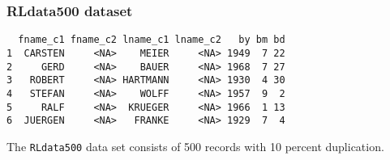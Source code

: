 \documentclass[compress]{beamer}
\theoremstyle{plain}
\begin{document}
\begin{frame}[fragile]
\frametitle{RLdata500 dataset}

\begin{verbatim}
  fname_c1 fname_c2 lname_c1 lname_c2   by bm bd
1  CARSTEN     <NA>    MEIER     <NA> 1949  7 22
2     GERD     <NA>    BAUER     <NA> 1968  7 27
3   ROBERT     <NA> HARTMANN     <NA> 1930  4 30
4   STEFAN     <NA>    WOLFF     <NA> 1957  9  2
5     RALF     <NA>  KRUEGER     <NA> 1966  1 13
6  JUERGEN     <NA>   FRANKE     <NA> 1929  7  4
\end{verbatim}

The \texttt{RLdata500} data set consists of 500 records with 10 percent duplication. 
\end{frame}



%
%

\end{document}
